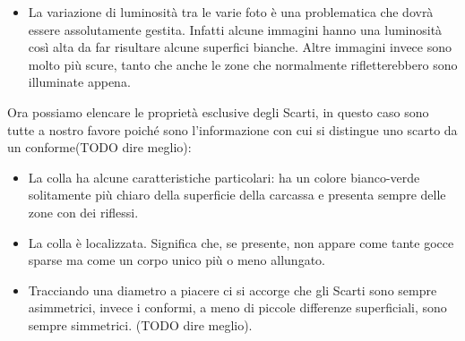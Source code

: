 \begin{itemize}

  \item La variazione di luminosità tra le varie foto è una problematica che dovrà essere assolutamente gestita.
    Infatti alcune immagini hanno una luminosità così alta da far risultare alcune superfici bianche.
    Altre immagini invece sono molto più scure, tanto che anche le zone che normalmente rifletterebbero sono illuminate appena.

\end{itemize}


Ora possiamo elencare le proprietà esclusive degli Scarti, in questo caso sono tutte a nostro favore poiché sono l'informazione con cui si distingue uno scarto da un conforme(TODO dire meglio):
\begin{itemize}
  \item La colla ha alcune caratteristiche particolari: ha un colore bianco-verde solitamente più chiaro della superficie della carcassa e presenta sempre delle zone con dei riflessi.

  \item La colla è localizzata.
    Significa che, se presente, non appare come tante gocce sparse ma come un corpo unico più o meno allungato.

  \item Tracciando una diametro a piacere ci si accorge che gli Scarti sono sempre asimmetrici, invece i conformi, a meno di piccole differenze superficiali, sono sempre simmetrici. (TODO dire meglio).

    

\end{itemize}


